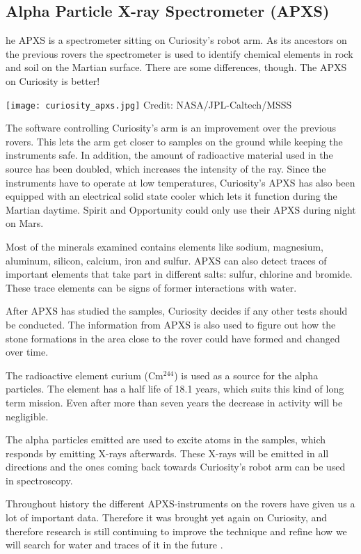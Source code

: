 \subsection{Alpha Particle X-ray Spectrometer (APXS)}
he APXS is a spectrometer sitting on Curiosity's robot arm.
As its ancestors on the previous rovers the spectrometer is used to identify chemical elements in rock and soil on the Martian surface.
There are some differences, though.
The APXS on Curiosity is better!

\begin{center}
	\texttt{[image: curiosity\_apxs.jpg]}
	\tiny{Credit: NASA/JPL-Caltech/MSSS}
\end{center}

The software controlling Curiosity's arm is an improvement over the previous rovers.
This lets the arm get closer to samples on the ground while keeping the instruments safe.
In addition, the amount of radioactive material used in the source has been doubled, which increases the intensity of the ray.
Since the instruments have to operate at low temperatures, Curiosity's APXS has also been equipped with an electrical solid state cooler which lets it function during the Martian daytime.
Spirit and Opportunity could only use their APXS during night on Mars.

Most of the minerals examined contains elements like sodium, magnesium, aluminum, silicon, calcium, iron and sulfur.
APXS can also detect traces of important elements that take part in different salts: sulfur, chlorine and bromide.
These trace elements can be signs of former interactions with water.

After APXS has studied the samples, Curiosity decides if any other tests should be conducted.
The information from APXS is also used to figure out how the stone formations in the area close to the rover could have formed and changed over time.

The radioactive element curium (Cm$^{244}$) is used as a source for the alpha particles.
The element has a half life of 18.1 years, which suits this kind of long term mission.
Even after more than seven years the decrease in activity will be negligible.

The alpha particles emitted are used to excite atoms in the samples, which responds by emitting X-rays afterwards.
These X-rays will be emitted in all directions and the ones coming back towards Curiosity's robot arm can be used in spectroscopy.

Throughout history the different APXS-instruments on the rovers have given us a lot of important data.
Therefore it was brought yet again on Curiosity, and therefore research is still continuing to improve the technique and refine how we will search for water and traces of it in the future \cite{NASA-rover}.